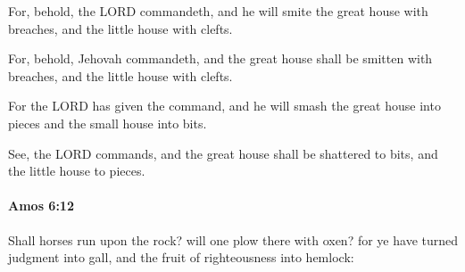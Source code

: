 			For, behold, the LORD commandeth, and he will smite the great house with breaches, and the little house with clefts.

			\begin{versebox}
					\item[BHS] 
					\item[LXX] 
					\item[ASV] For, behold, Jehovah commandeth, and the great house shall be smitten with breaches, and the little house with clefts.
					\item[NIV] For the LORD has given the command, and he will smash the great house into pieces and the small house into bits.
					\item[NRSV] See, the LORD commands, and the great house shall be shattered to bits, and the little house to pieces.
			\end{versebox}

		\paragraph{Amos 6:12} %
			\label{AMOS-6-12}

			Shall horses run upon the rock? will one plow there with oxen? for ye have turned judgment into gall, and the fruit of righteousness into hemlock:

